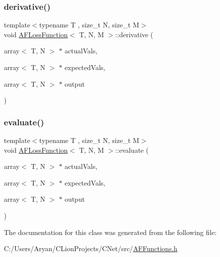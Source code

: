 \subsubsection{\texorpdfstring{derivative()}{derivative()}}
{\footnotesize\ttfamily template$<$typename T , size\+\_\+t N, size\+\_\+t M$>$ \\
void \hyperlink{class_a_f_loss_function}{A\+F\+Loss\+Function}$<$ T, N, M $>$\+::derivative (\begin{DoxyParamCaption}\item[{array$<$ T, N $>$ $\ast$}]{actual\+Vals,  }\item[{array$<$ T, N $>$ $\ast$}]{expected\+Vals,  }\item[{array$<$ T, N $>$ $\ast$}]{output }\end{DoxyParamCaption})\hspace{0.3cm}{\ttfamily [inline]}}

\mbox{\label{class_a_f_loss_function_a9008be15bf8a601ec1d1cee65f45d5e3}} 
\subsubsection{\texorpdfstring{evaluate()}{evaluate()}}
{\footnotesize\ttfamily template$<$typename T , size\+\_\+t N, size\+\_\+t M$>$ \\
void \hyperlink{class_a_f_loss_function}{A\+F\+Loss\+Function}$<$ T, N, M $>$\+::evaluate (\begin{DoxyParamCaption}\item[{array$<$ T, N $>$ $\ast$}]{actual\+Vals,  }\item[{array$<$ T, N $>$ $\ast$}]{expected\+Vals,  }\item[{array$<$ T, N $>$ $\ast$}]{output }\end{DoxyParamCaption})\hspace{0.3cm}{\ttfamily [inline]}}



The documentation for this class was generated from the following file\+:\begin{DoxyCompactItemize}
\item 
C\+:/\+Users/\+Aryan/\+C\+Lion\+Projects/\+C\+Net/src/\hyperlink{_a_f_functions_8h}{A\+F\+Functions.\+h}\end{DoxyCompactItemize}
